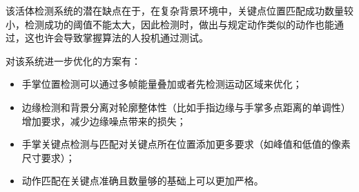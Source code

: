 \documentclass[a4paper, fontset=none]{article}
\begin{document}
该活体检测系统的潜在缺点在于，在复杂背景环境中，关键点位置匹配成功数量较小，检测成功的阈值不能太大，因此检测时，做出与规定动作类似的动作也能通过，这也许会导致掌握算法的人投机通过测试。

对该系统进一步优化的方案有：
\begin{itemize}
  \item 手掌位置检测可以通过多帧能量叠加或者先检测运动区域来优化；
  \item 边缘检测和背景分离对轮廓整体性（比如手指边缘与手掌多点距离的单调性）增加要求，减少边缘噪点带来的损失；
  \item 手掌关键点检测与匹配对关键点所在位置添加更多要求（如峰值和低值的像素尺寸要求）；
  \item 动作匹配在关键点准确且数量够的基础上可以更加严格。
\end{itemize}
\end{document}
